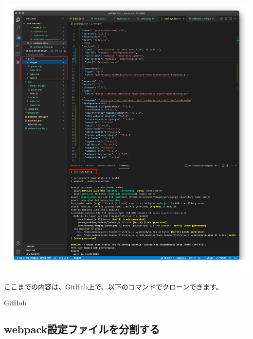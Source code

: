 \begin{reviewimage}%
\includegraphics[width=1.0\maxwidth]{./images/02-create-react-app/webpack_test05.png}%
\label{image:02-create-react-app:webpack_test05}
\end{reviewimage}

\clearpage

\begin{starternote}[]{}

ここまでの内容は、GitHub上で、以下のコマンドでクローンできます。

\def\startercodeblockfontsize{}
\begin{starterterminal}[]{GitHub}\end{starterterminal}
\end{starternote}

\subsection{webpack設定ファイルを分割する}
\keeplastskip{
  \label{sec:2-2-5}
  \label{sec-04-webpack-config-all}
  \par\nobreak
}

